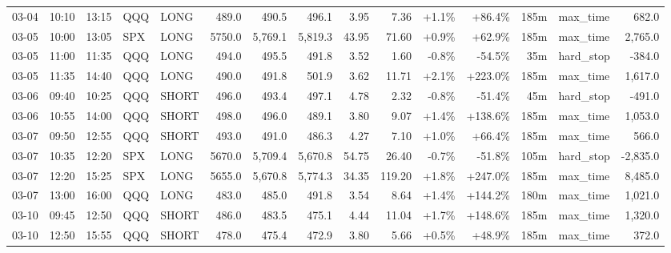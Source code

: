 \documentclass[11pt,a4paper,twoside]{article}
\begin{document}
\begin{landscape}
\begin{center}
\begin{longtable}{>{\color{txtmain}}l l l l l r r r r r r r r >{\color{txtmain}}l r}
03-04 & 10:10 & 13:15 & QQQ & LONG & 489.0 & 490.5 & 496.1 & 3.95 & 7.36 & \textcolor{wingreen}{+1.1\%} & \textcolor{wingreen}{+86.4\%} & 185m & max\_time & \textcolor{wingreen}{682.0} \\
03-05 & 10:00 & 13:05 & SPX & LONG & 5750.0 & 5,769.1 & 5,819.3 & 43.95 & 71.60 & \textcolor{wingreen}{+0.9\%} & \textcolor{wingreen}{+62.9\%} & 185m & max\_time & \textcolor{wingreen}{2,765.0} \\
03-05 & 11:00 & 11:35 & QQQ & LONG & 494.0 & 495.5 & 491.8 & 3.52 & 1.60 & \textcolor{lossred}{-0.8\%} & \textcolor{lossred}{-54.5\%} & 35m & hard\_stop & \textcolor{lossred}{-384.0} \\
03-05 & 11:35 & 14:40 & QQQ & LONG & 490.0 & 491.8 & 501.9 & 3.62 & 11.71 & \textcolor{wingreen}{+2.1\%} & \textcolor{wingreen}{+223.0\%} & 185m & max\_time & \textcolor{wingreen}{1,617.0} \\
03-06 & 09:40 & 10:25 & QQQ & SHORT & 496.0 & 493.4 & 497.1 & 4.78 & 2.32 & \textcolor{lossred}{-0.8\%} & \textcolor{lossred}{-51.4\%} & 45m & hard\_stop & \textcolor{lossred}{-491.0} \\
03-06 & 10:55 & 14:00 & QQQ & SHORT & 498.0 & 496.0 & 489.1 & 3.80 & 9.07 & \textcolor{wingreen}{+1.4\%} & \textcolor{wingreen}{+138.6\%} & 185m & max\_time & \textcolor{wingreen}{1,053.0} \\
03-07 & 09:50 & 12:55 & QQQ & SHORT & 493.0 & 491.0 & 486.3 & 4.27 & 7.10 & \textcolor{wingreen}{+1.0\%} & \textcolor{wingreen}{+66.4\%} & 185m & max\_time & \textcolor{wingreen}{566.0} \\
03-07 & 10:35 & 12:20 & SPX & LONG & 5670.0 & 5,709.4 & 5,670.8 & 54.75 & 26.40 & \textcolor{lossred}{-0.7\%} & \textcolor{lossred}{-51.8\%} & 105m & hard\_stop & \textcolor{lossred}{-2,835.0} \\
03-07 & 12:20 & 15:25 & SPX & LONG & 5655.0 & 5,670.8 & 5,774.3 & 34.35 & 119.20 & \textcolor{wingreen}{+1.8\%} & \textcolor{wingreen}{+247.0\%} & 185m & max\_time & \textcolor{wingreen}{8,485.0} \\
03-07 & 13:00 & 16:00 & QQQ & LONG & 483.0 & 485.0 & 491.8 & 3.54 & 8.64 & \textcolor{wingreen}{+1.4\%} & \textcolor{wingreen}{+144.2\%} & 180m & max\_time & \textcolor{wingreen}{1,021.0} \\
03-10 & 09:45 & 12:50 & QQQ & SHORT & 486.0 & 483.5 & 475.1 & 4.44 & 11.04 & \textcolor{wingreen}{+1.7\%} & \textcolor{wingreen}{+148.6\%} & 185m & max\_time & \textcolor{wingreen}{1,320.0} \\
03-10 & 12:50 & 15:55 & QQQ & SHORT & 478.0 & 475.4 & 472.9 & 3.80 & 5.66 & \textcolor{wingreen}{+0.5\%} & \textcolor{wingreen}{+48.9\%} & 185m & max\_time & \textcolor{wingreen}{372.0} \\

\end{longtable}
\end{center}
\end{landscape}
\end{document}
